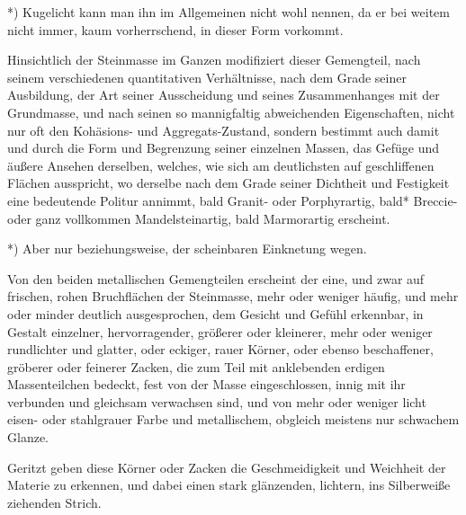 \documentclass[a4paper, 11pt, oneside, german]{article}
\begin{document}
*) Kugelicht kann man ihn im Allgemeinen nicht wohl nennen, da er bei weitem nicht immer, kaum vorherrschend, in dieser Form vorkommt.

Hinsichtlich der Steinmasse im Ganzen modifiziert dieser Gemengteil, nach seinem verschiedenen quantitativen Verhältnisse, nach dem Grade seiner Ausbildung, der Art seiner Ausscheidung und seines Zusammenhanges mit der Grundmasse, und nach seinen so mannigfaltig abweichenden Eigenschaften, nicht nur oft den Kohäsions- und Aggregats-Zustand, sondern bestimmt auch damit und durch die Form und Begrenzung seiner einzelnen Massen, das Gefüge und äußere Ansehen derselben, welches, wie sich am deutlichsten auf geschliffenen Flächen ausspricht, wo derselbe nach dem Grade seiner Dichtheit und Festigkeit eine bedeutende Politur annimmt, bald Granit- oder Porphyrartig, bald* Breccie- oder ganz vollkommen Mandelsteinartig, bald Marmorartig erscheint.

*) Aber nur beziehungsweise, der scheinbaren Einknetung wegen.

Von den beiden metallischen Gemengteilen erscheint der eine, und zwar auf frischen, rohen Bruchflächen der Steinmasse, mehr oder weniger häufig, und mehr oder minder deutlich ausgesprochen, dem Gesicht und Gefühl erkennbar, in Gestalt einzelner, hervorragender, größerer oder kleinerer, mehr oder weniger rundlichter und glatter, oder eckiger, rauer Körner, oder ebenso beschaffener, gröberer oder feinerer Zacken, die zum Teil mit anklebenden erdigen Massenteilchen bedeckt, fest von der Masse eingeschlossen, innig mit ihr verbunden und gleichsam verwachsen sind, und von mehr oder weniger licht eisen- oder stahlgrauer Farbe und metallischem, obgleich meistens nur schwachem Glanze.

Geritzt geben diese Körner oder Zacken die Geschmeidigkeit und Weichheit der Materie zu erkennen, und dabei einen stark glänzenden, lichtern, ins Silberweiße ziehenden Strich.
\end{document}

